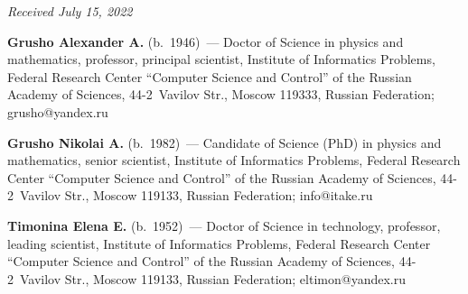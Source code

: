 \vspace*{-6pt}

\hfill{\small\textit{Received July 15, 2022}}

\Contr

\noindent
\textbf{Grusho Alexander A.} (b.\ 1946)~--- Doctor of Science in physics and mathematics, professor, 
principal scientist, Institute of Informatics Problems, Federal Research Center ``Computer Science and 
Control'' of the Russian Academy of Sciences, 44-2~Vavilov Str., Moscow 119333, Russian 
Federation; \mbox{grusho@yandex.ru}

\vspace*{3pt}

\noindent
\textbf{Grusho Nikolai A.} (b.\ 1982)~--- Candidate of Science (PhD) in physics and mathematics, 
senior scientist, Institute of Informatics Problems, Federal Research Center ``Computer Science and 
Control'' of the Russian Academy of Sciences, 44-2~Vavilov Str., Moscow 119133, Russian 
Federation; \mbox{info@itake.ru}


\vspace*{3pt}

\noindent
\textbf{Timonina Elena E.} (b.\ 1952)~--- Doctor of Science in technology, professor, leading scientist, 
Institute of Informatics Problems, Federal Research Center ``Computer Science and Control'' of the 
Russian Academy of Sciences, 44-2~Vavilov Str., Moscow 119133, Russian Federation; 
\mbox{eltimon@yandex.ru}


\label{end\stat}

\renewcommand{\bibname}{\protect\rm Литература}    